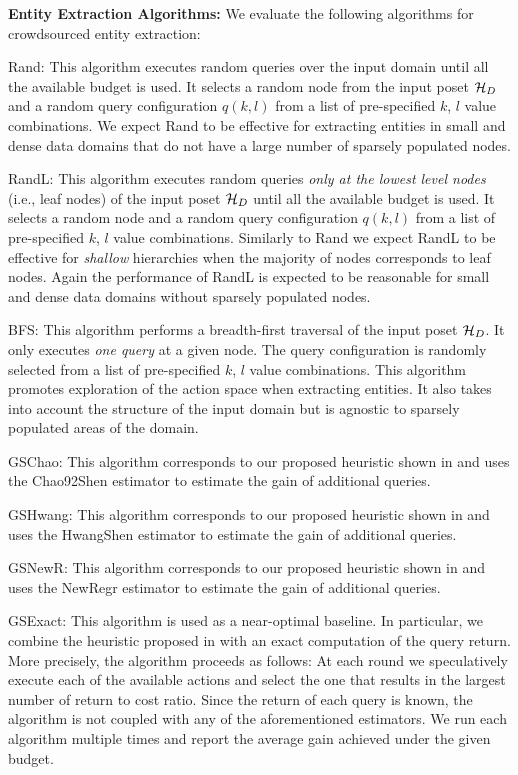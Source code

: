 \vspace{5pt}\noindent\textbf{Entity Extraction Algorithms:} We evaluate the following algorithms for crowdsourced entity extraction:
\squishlist
\item Rand: This algorithm executes random queries over the input domain until all the available budget is used. It selects a random node from the input poset $\mathcal{H}_D$ and a random query configuration $q(k,l)$ from a list of pre-specified $k$, $l$ value combinations. We expect Rand to be effective for extracting entities in small and dense data domains that do not have a large number of sparsely populated nodes. 
\item RandL: This algorithm executes random queries {\em only at the lowest level nodes} (i.e., leaf nodes) of the input poset $\mathcal{H}_D$ until all the available budget is used. It selects a random node and a random query configuration $q(k,l)$ from a list of pre-specified $k$, $l$ value combinations. Similarly to Rand we expect RandL to be effective for {\em shallow} hierarchies when the majority of nodes corresponds to leaf nodes. Again the performance of RandL is expected to be reasonable for small and dense data domains without sparsely populated nodes. 
\item BFS: This algorithm performs a breadth-first traversal of the input poset $\mathcal{H}_D$. It only executes {\em one query} at a given node. The query configuration is randomly selected from a list of pre-specified $k$, $l$ value combinations. This algorithm promotes exploration of the action space when extracting entities. It also takes into account the structure of the input domain but is agnostic to sparsely populated areas of the domain.
\item GSChao: This algorithm corresponds to our proposed heuristic shown in  and uses the Chao92Shen estimator to estimate the gain of additional queries.
\item GSHwang: This algorithm corresponds to our proposed heuristic shown in  and uses the HwangShen estimator to estimate the gain of additional queries.
\item GSNewR: This algorithm corresponds to our proposed heuristic shown in  and uses the NewRegr estimator to estimate the gain of additional queries.
\item GSExact: This algorithm is used as a near-optimal baseline. In particular, we combine the heuristic proposed in  with an exact computation of the query return. More precisely, the algorithm proceeds as follows: At each round we speculatively execute each of the available actions and select the one that results in the largest  number of return to cost ratio. Since the return of each query is known, the algorithm is not coupled with any of the aforementioned estimators.
\squishend
We run each algorithm multiple times and report the average gain achieved under the given budget.

